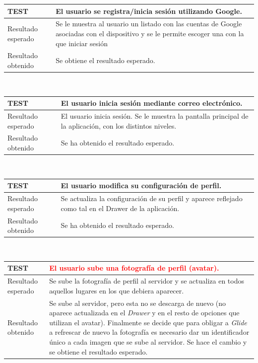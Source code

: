 \documentclass[twoside]{report}
\newcommand\addrow[2]{#1 &#2\\ }
\newcommand\addheading[2]{#1 &#2\\ \hline}
\newcommand\tabularhead{\begin{tabular}{lp{0.7\textwidth}}
\hline
}
\newenvironment{test}{\tabularhead}
{\hline\end{tabular}}
\begin{document}
\vspace{0.5cm}

\begin{test}
  \addheading{\textbf{TEST\arabic{test}}}{El usuario se registra/inicia sesión utilizando Google.} 
  \addrow{Resultado esperado}{Se le muestra al usuario un listado con las cuentas de Google asociadas con el dispositivo y se le permite escoger una con la que iniciar sesión}
  \addrow{Resultado obtenido}{Se obtiene el resultado esperado.}
\end{test}\\

\vspace{0.5cm}

\begin{test}
  \addheading{\textbf{TEST\arabic{test}}}{El usuario inicia sesión mediante correo electrónico.} 
  \addrow{Resultado esperado}{El usuario inicia sesión. Se le muestra la pantalla principal de la aplicación, con los distintos niveles.}
  \addrow{Resultado obtenido}{Se ha obtenido el resultado esperado.}
\end{test}\\

\vspace{0.5cm}

\begin{test}
  \addheading{\textbf{TEST\arabic{test}}}{El usuario modifica su configuración de perfil.} 
  \addrow{Resultado esperado}{Se actualiza la configuración de su perfil y aparece reflejado como tal en el Drawer de la aplicación.}
  \addrow{Resultado obtenido}{Se ha obtenido el resultado esperado.}
\end{test}\\

\vspace{0.5cm}

\begin{test}
  \addheading{\textbf{TEST\arabic{test}}}{\textcolor{red}{El usuario sube una fotografía de perfil (avatar).}} 
  \addrow{Resultado esperado}{Se sube la fotografía de perfil al servidor y se actualiza en todos aquellos lugares en los que debiera aparecer.}
  \addrow{Resultado obtenido}{Se sube al servidor, pero esta no se descarga de nuevo (no aparece actualizada en el \textit{Drawer} y en el resto de opciones que utilizan el avatar). Finalmente se decide que para obligar a \textit{Glide} a refrescar de nuevo la fotografía es necesario dar un identificador único a cada imagen que se sube al servidor. Se hace el cambio y se obtiene el resultado esperado.}
\end{test}\\
\end{document}
